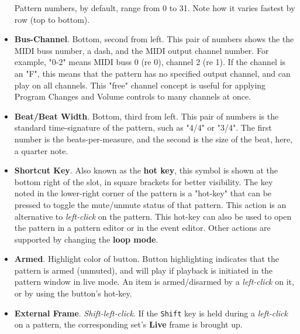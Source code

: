 \begin{itemize}
         Pattern numbers, by default, range from 0 to 31.
         Note how it varies fastest by row (top to bottom).
      \item \textbf{Bus-Channel}. Bottom, second from left.
         This pair of numbers shows the the MIDI buss number, a dash, and
         the MIDI output channel number.
         For example, "0-2" means MIDI buss 0 (re 0), channel 2 (re 1).
         If the channel is an "F", this means that the pattern has no specified
         output channel, and can play on all channels.
         This "free" channel concept is useful for applying Program Changes and
         Volume controls to many channels at once.
      \item \textbf{Beat/Beat Width}. Bottom, third from left.
         This pair of numbers is the standard time-signature of the pattern,
         such as "4/4" or "3/4".  The first number is the beats-per-measure,
         and the second is the size of the beat, here, a quarter note.
      \item \textbf{Shortcut Key}.  Also known as the
         \textbf{hot key}, this symbol is shown at the bottom right of the
         slot, in square brackets for better visibility.
         The key noted in the lower-right corner of the pattern is a "hot-key"
         that can be pressed to toggle the mute/unmute status of that pattern.
         This action is an alternative to
         \textsl{left-click} on the pattern.
         This hot-key can also be used to open the pattern in a pattern editor
         or in the event editor.
         Other actions are supported by changing the 
         \textbf{loop mode}.
      \item \textbf{Armed}. Highlight color of button.
         Button highlighting indicates that the pattern is armed
         (unmuted), and will play if playback is initiated in the pattern
         window in live mode.
         An item is armed/disarmed by a
         \textsl{left-click} on it, or by using the
         button's hot-key.
      \item \textbf{External Frame}. \textsl{Shift-left-click}.
         If the \texttt{Shift} key is held during a
         \textsl{left-click} on a pattern,
         the corresponding set's \textbf{Live} frame is brought up.
   \end{itemize}

